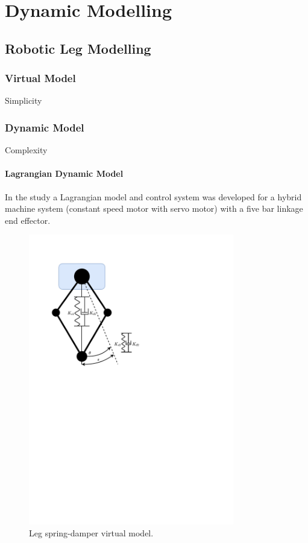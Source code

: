\chapter{Dynamic Modelling}

\section{Robotic Leg Modelling}

\subsection{Virtual Model}
Simplicity 
\subsection{Dynamic Model}
Complexity
\subsubsection{Lagrangian Dynamic Model}
In the study \cite{Yu2006} a Lagrangian model and control system was developed for a hybrid machine system (constant speed motor with servo motor) with a five bar linkage end effector. 

\begin{figure}
\centering
\includegraphics[clip, trim=2cm 15cm 9cm 2cm, page = 1, width=0.8\textwidth]{images/geometry/leg-spring-damper} 
\caption{Leg spring-damper virtual model.}
\label{fig:Leg spring-damper virtual model}
\end{figure}

